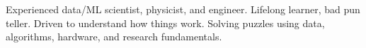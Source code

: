 

\begin{cvparagraph}

Experienced data/ML scientist, physicist, and engineer. Lifelong learner, bad pun teller. Driven to understand how things work. Solving puzzles using data, algorithms, hardware, and research fundamentals. 
\end{cvparagraph}
